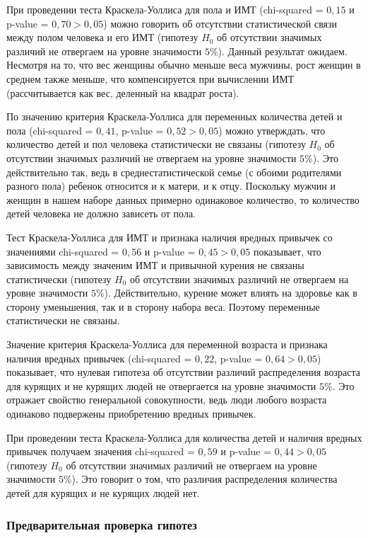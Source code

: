\documentclass[a4paper,12pt]{article}
\begin{document}
При проведении теста Краскела-Уоллиса для пола и ИМТ (chi-squared = $0,15$ и p-value = $0,70 > 0,05$) можно говорить об отсутствии статистической связи между полом человека и его ИМТ (гипотезу $H_0$ об отсутствии значимых различий не отвергаем на уровне значимости $5\%$). Данный результат ожидаем. Несмотря на то, что вес женщины обычно меньше веса мужчины, рост женщин в среднем также меньше, что компенсируется при вычислении ИМТ (рассчитывается как вес, деленный на квадрат роста).

По значению критерия Краскела-Уоллиса для переменных количества детей и пола (chi-squared = $0,41$,  p-value = $0,52 > 0,05$) можно утверждать, что количество детей и пол человека статистически не связаны (гипотезу $H_0$ об отсутствии значимых различий не отвергаем на уровне значимости $5\%$). Это действительно так, ведь в среднестатистической семье (с обоими родителями разного пола) ребенок относится и к матери, и к отцу. Поскольку мужчин и женщин в нашем наборе данных примерно одинаковое количество, то количество детей человека не должно зависеть от пола.

Тест Краскела-Уоллиса для ИМТ и признака наличия вредных привычек со значениями chi-squared = $0,56$ и p-value = $0,45 > 0,05$ показывает, что зависимость между значеним ИМТ и привычной курения не связаны статистически (гипотезу $H_0$ об отсутствии значимых различий не отвергаем на уровне значимости $5\%$). Действительно, курение может влиять на здоровье как в сторону уменьшения, так и в сторону набора веса. Поэтому переменные статистически не связаны.

Значение критерия Краскела-Уоллиса для переменной возраста и признака наличия вредных привычек (chi-squared = $0,22$, p-value = $0,64 > 0,05$) показывает, что нулевая гипотеза об отсутствии различий распределения возраста для курящих и не курящих людей не отвергается на уровне значимости $5\%$. Это отражает свойство генеральной совокупности, ведь люди любого возраста одинаково подвержены приобретению вредных привычек.

При проведении теста Краскела-Уоллиса для количества детей и наличия вредных привычек получаем значения chi-squared = $0,59$ и p-value = $0,44 > 0,05$ (гипотезу $H_0$ об отсутствии значимых различий не отвергаем на уровне значимости $5\%$). Это говорит о том, что различия распределения количества детей для курящих и не курящих людей нет.

\subsubsection{Предварительная проверка гипотез}
\end{document}
